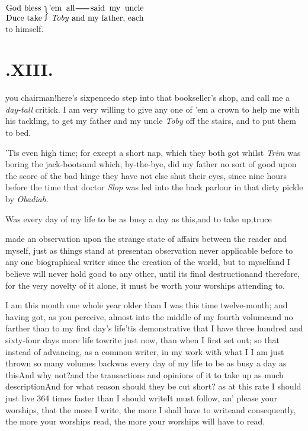 \documentclass[twoside]{article}
\begin{document}
\indent$\vcenter{\halign{#\rlap{\phantom{y}}\hss\cr
God bless\cr
Duce take\cr}}\,\Big\}
\vcenter{\halign{#\cr
’em all\tsk said my uncle\cr
\;\textit{Toby} and my father, each\cr}}$
\\[4pt] to himself.

\smallskip
\section{.\enspace XIII.} 

\tsk you chairman!\tsk here’s\break
sixpence\tsk do step into that book\-seller’s shop, and call me a
\textit{day-tall}\break
critick. I am very willing to give any one of ’em a crown to help me
with his tackling, to get my father and my uncle \textit{Toby} off
the stairs, and to put them to bed.\tsk

\tsk ’Tis even high time; for except a short nap, which
they both got whilst \textit{Trim} was boring the
jack-boots\tsk and which, by-the-bye, did my father no sort of
good upon the score of the bad hinge\break
\tsk they have not else shut their eyes, since
nine hours before the time that doctor \textit{Slop} was led into the
back parlour in that dirty pickle by \textit{Obadiah}.

Was every day of my life to be as\break
busy a day as this,\tsk and to take up,\tsk truce\tsk

made an observation upon the strange state of affairs between the reader and myself,
just as things stand at present\tsk an observation never
applicable before to any one biographical writer since the creation
of the world, but to myself\tsk and I believe will never hold
good to any other, until its final destruction\tsk\break and therefore,
for the very novelty of it alone, it must be worth your worships
attending to.

I am this month one whole year older than I was this time twelve-month; and having
got, as you perceive, almost into the middle of my fourth volume\tsk and no farther
than to my first day’s life\tsk\break ’tis demonstrative that I have three hundred and
sixty-four days more life to\break write just now, than when I first set out;\break
so that instead of advancing, as a common writer, in my work with
what I
 I am just thrown so many volumes
back\break\tsk was every day of my
life to be as busy a day as this\tsk And why not?\tsk and the transactions and opinions
of it to take up as much description\tsk And for what reason should they be cut short?
as at this rate I should just live 364 times faster than I should write\tsk It must
follow, an’ please your worships, that the more I write, the more I shall have to
write\tsk and consequently, the more your worships read, the more your worships will
have to read.
\end{document}

